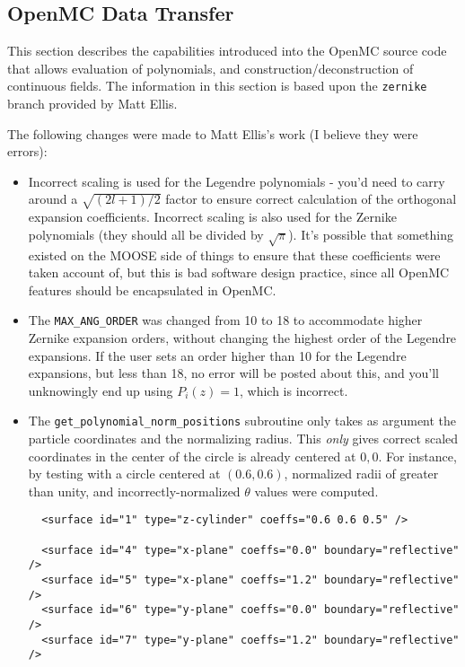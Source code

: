 \documentclass[10pt]{article}
\numberwithin{equation}{section} %
\begin{document}
\subsection{OpenMC Data Transfer}
This section describes the capabilities introduced into the OpenMC source code that allows evaluation of polynomials, and construction/deconstruction of continuous fields. The information in this section is based upon the {\tt zernike} branch provided by Matt Ellis. 

The following changes were made to Matt Ellis's work (I believe they were errors):

\begin{itemize}
\item Incorrect scaling is used for the Legendre polynomials - you'd need to carry around a \(\sqrt{(2l+1)/2}\) factor to ensure correct calculation of the orthogonal expansion coefficients. Incorrect scaling is also used for the Zernike polynomials (they should all be divided by \(\sqrt{\pi}\)). It's possible that something existed on the MOOSE side of things to ensure that these coefficients were taken account of, but this is bad software design practice, since all OpenMC features should be encapsulated in OpenMC.
\item The {\tt MAX\_ANG\_ORDER} was changed from 10 to 18 to accommodate higher Zernike expansion orders, without changing the highest order of the Legendre expansions. If the user sets an order higher than 10 for the Legendre expansions, but less than 18, no error will be posted about this, and you'll unknowingly end up using \(P_{i}(z)=1\), which is incorrect.
\item The {\tt get\_polynomial\_norm\_positions} subroutine only takes as argument the particle coordinates and the normalizing radius. This {\it only} gives correct scaled coordinates in the center of the circle is already centered at \(0, 0\). For instance, by testing with a circle centered at \((0.6, 0.6)\), normalized radii of greater than unity, and incorrectly-normalized \(\theta\) values were computed. 

\begin{lstlisting}
  <surface id="1" type="z-cylinder" coeffs="0.6 0.6 0.5" />

  <surface id="4" type="x-plane" coeffs="0.0" boundary="reflective" />
  <surface id="5" type="x-plane" coeffs="1.2" boundary="reflective" />
  <surface id="6" type="y-plane" coeffs="0.0" boundary="reflective" />
  <surface id="7" type="y-plane" coeffs="1.2" boundary="reflective" />


\end{lstlisting}
\end{itemize}
\end{document}
